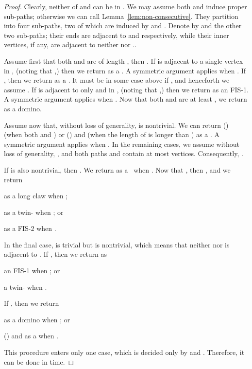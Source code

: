 \documentclass[10pt]{article}
\begin{document}
\begin{proof}
  Clearly, neither of  and  can be in .  We may assume both
   and  induce proper sub-paths; otherwise we can call
  Lemma~\ref{lem:non-consecutive}.  They partition  into four
  sub-paths, two of which are induced by  and .
  Denote by  and  the other two sub-paths; their ends are
  adjacent to  and  respectively, while their inner vertices, if
  any, are adjacent to neither  nor ..

  Assume first that both  and  are of length , then .  If  is adjacent to a single vertex 
  in , (noting that ,) then we return  as a .  A symmetric argument
  applies when .  If , then we
  return  as a .  It must be in some
  case above if , and henceforth we assume .  If 
  is adjacent to only  and  in , (noting that
  ,) then we return  as an FIS-1.  A symmetric argument applies when .  Now that both  and  are at least , we
  return  as a domino.

  Assume now that, without loss of generality,  is nontrivial.
  We can return () (when both  and ) or () and  (when
  the length of  is longer than ) as a .  A symmetric
  argument applies when .  In the remaining
  cases, we assume without loss of generality, , and
  both paths  and  contain at most  vertices.
  Consequently, .

  If  is also nontrivial, then .  We
  return  as a
  \dag\ when .
  Now that , then , and we return
  \begin{inparaenum}[(\itshape 1\upshape)]
  \item  as a long claw when ;
  \item   as a twin- when ; or
  \item  as a FIS-2 when .
  \end{inparaenum}
  In the final case,  is trivial but  is nontrivial, which
  means that neither  nor  is adjacent to .  If
  , then we return  as
  \begin{inparaenum}[(\itshape 1\upshape)]
  \item an FIS-1 when ; or
  \item a twin- when .
  \end{inparaenum}
  If , then we return
  \begin{inparaenum}[(\itshape 1\upshape)]
  \item  as a domino when ; or
  \item () and  as a  when .
  \end{inparaenum}
  This procedure enters only one case, which is decided only by
   and .  Therefore, it can be done in  time.
\end{proof}
\end{document}
